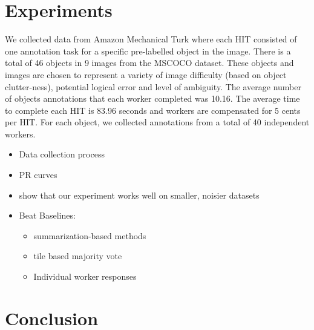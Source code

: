 \documentclass[letterpaper]{article} %
\begin{document}
\section{Experiments}
We collected data from Amazon Mechanical Turk where each HIT consisted of one annotation task for a specific pre-labelled object in the image. There is a total of 46 objects in 9 images from the MSCOCO dataset\cite{Lin2014}. These objects and images are chosen to represent a variety of image difficulty (based on object clutter-ness), potential logical error and level of ambiguity. The average number of objects annotations that each worker completed was 10.16. The average time to complete each HIT is 83.96 seconds and workers are compensated for 5 cents per HIT.  For each object, we collected annotations from a total of 40 independent workers.
\begin{itemize}
\item Data collection process
\item PR curves
\item show that our experiment works well on smaller, noisier datasets
\item Beat Baselines: 
\begin{itemize}
\item summarization-based methods
\item tile based majority vote 
\item Individual worker responses
\end{itemize}
\end{itemize}
\section{Conclusion}


\end{document}
